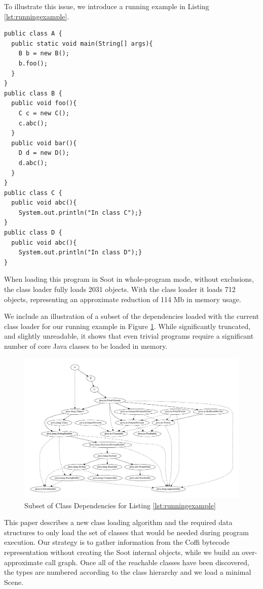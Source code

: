 \documentclass{sigplanconf}
\begin{document}
To illustrate this issue, we introduce a running example in Listing \ref{lst:runningexample}.

\begin{lstlisting}[caption={Running example},label={lst:runningexample},float=!ht]
public class A {
  public static void main(String[] args){
    B b = new B();
    b.foo();
  }
}
public class B {
  public void foo(){
    C c = new C();
    c.abc();
  }
  public void bar(){
    D d = new D();
    d.abc();
  }
}
public class C {
  public void abc(){
    System.out.println("In class C");}
}
public class D {
  public void abc(){
    System.out.println("In class D");}
}
\end{lstlisting}

When loading this program in Soot in whole-program mode, without exclusions, the class loader fully loads 2031 \sootclass objects. With the \rb class loader it loads 712 \sootclass objects, representing an approximate reduction of 114 Mb in memory usage.


We include an illustration of a subset of the dependencies loaded with the current class loader for our running example in Figure \ref{fig:deps}. While significantly truncated, and slightly unreadable, it shows that even trivial programs require a significant number of core Java classes to be loaded in memory.

\begin{figure}

\includegraphics[scale=0.17,angle=0]{together-trim.pdf} 

\caption{Subset of Class Dependencies for Listing \ref{lst:runningexample}}
\label{fig:deps}
\end{figure}
This paper describes a new class loading algorithm and the required data structures to only load the set of classes that would be needed during program execution. Our strategy is to gather information from the Coffi bytecode representation without creating the Soot internal objects, while we build an over-approximate call graph. Once all of the reachable classes have been discovered, the types are numbered according to the class hierarchy and we load a minimal Scene.
\end{document}
